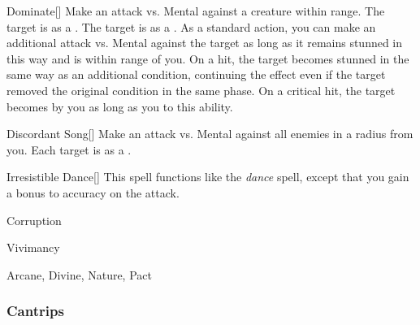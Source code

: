 \lowercase{\hypertarget{spell:Dominate}{}}\label{spell:Dominate}
\begin{freeability}[\nth{4}]{\hypertarget{spell:Dominate}{Dominate}}[]
Make an attack vs. Mental against a creature within \rngmed range.
\hit The target is  as a .
\crit The target is  as a .
As a standard action, you can make an additional attack vs. Mental against the target as long as it remains stunned in this way and is within \rngmed range of you.
On a hit, the target becomes stunned in the same way as an additional condition, continuing the effect even if the target removed the original condition in the same phase.
On a critical hit, the target becomes  by you as long as you  to this ability.
\end{freeability}
\vspace{0.25em}



\lowercase{\hypertarget{spell:Discordant Song}{}}\label{spell:Discordant Song}
\begin{freeability}[\nth{5}]{\hypertarget{spell:Discordant Song}{Discordant Song}}[]
Make an attack vs. Mental against all enemies in a \areamed radius from you.
\hit Each target is \disoriented as a .
\end{freeability}
\vspace{0.25em}



\lowercase{\hypertarget{spell:Irresistible Dance}{}}\label{spell:Irresistible Dance}
\begin{freeability}[\nth{6}]{\hypertarget{spell:Irresistible Dance}{Irresistible Dance}}[]
This spell functions like the \textit{dance} spell, except that you gain a  bonus to accuracy on the attack.
\end{freeability}
\vspace{0.25em}


\newpage
\begin{spellsection}{Corruption}

\begin{spellheader}
\end{spellheader}


 Vivimancy

 Arcane, Divine, Nature, Pact

\subsubsection{Cantrips}


\end{spellsection}


